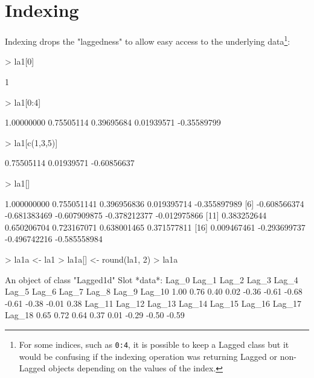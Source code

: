 \documentclass[a4paper,twoside,11pt,nojss,article]{jss}
\begin{document}
\section{Indexing}
\label{sec:org568a95d}

Indexing drops the "laggedness" to allow easy access to the underlying data\footnote{For some indices, such as \texttt{0:4}, it is possible to keep a Lagged class but it would be
confusing if the indexing operation was returning Lagged or non-Lagged objects depending on
the values of the index.}:
\begin{Schunk}
\begin{Sinput}
> la1[0]
\end{Sinput}
\begin{Soutput}
[1] 1
\end{Soutput}
\begin{Sinput}
> la1[0:4]
\end{Sinput}
\begin{Soutput}
[1]  1.00000000  0.75505114  0.39695684  0.01939571 -0.35589799
\end{Soutput}
\begin{Sinput}
> la1[c(1,3,5)]
\end{Sinput}
\begin{Soutput}
[1]  0.75505114  0.01939571 -0.60856637
\end{Soutput}
\begin{Sinput}
> la1[]
\end{Sinput}
\begin{Soutput}
 [1]  1.000000000  0.755051141  0.396956836  0.019395714 -0.355897989
 [6] -0.608566374 -0.681383469 -0.607909875 -0.378212377 -0.012975866
[11]  0.383252644  0.650206704  0.723167071  0.638001465  0.371577811
[16]  0.009467461 -0.293699737 -0.496742216 -0.585558984
\end{Soutput}
\end{Schunk}


\begin{Schunk}
\begin{Sinput}
> la1a <- la1
> la1a[] <- round(la1, 2)
> la1a
\end{Sinput}
\begin{Soutput}
An object of class "Lagged1d"
Slot *data*: 
 Lag_0  Lag_1  Lag_2  Lag_3  Lag_4  Lag_5  Lag_6  Lag_7  Lag_8  Lag_9 Lag_10 
  1.00   0.76   0.40   0.02  -0.36  -0.61  -0.68  -0.61  -0.38  -0.01   0.38 
Lag_11 Lag_12 Lag_13 Lag_14 Lag_15 Lag_16 Lag_17 Lag_18 
  0.65   0.72   0.64   0.37   0.01  -0.29  -0.50  -0.59 
\end{Soutput}
\end{Schunk}
\end{document}
